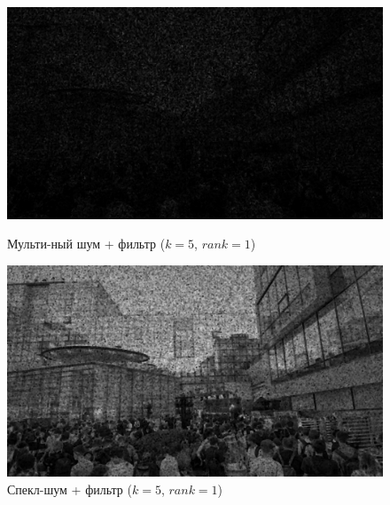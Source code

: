\documentclass[a4paper]{article}
\begin{document}
\begin{figure}[H]
    \begin{minipage}{0.49\textwidth}
        \centering \includegraphics[width=\textwidth]{images/3_nonlinear_filters/multiplicative - rang (k=5, rank=1).jpg}
        \caption{Мульти-ный шум + фильтр ($k = 5$, $rank = 1$)}
    \end{minipage}\hfill
    \begin{minipage}{0.49\textwidth}
        \centering \includegraphics[width=\textwidth]{images/3_nonlinear_filters/speckle - rang (k=5, rank=1).jpg}
        \caption{Спекл-шум + фильтр ($k = 5$, $rank = 1$)}
    \end{minipage}
\end{figure}
\end{document}
